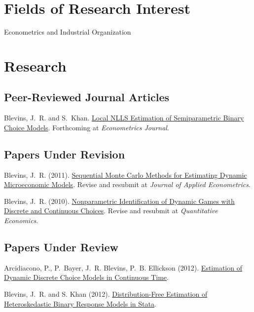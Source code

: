 \documentclass[10pt,letterpaper]{article}
\renewenvironment{itemize}{
  \begin{list}{}{
    \setlength{\leftmargin}{1.5em}
    \setlength{\itemsep}{0.25em}
    \setlength{\parskip}{0pt}
    \setlength{\parsep}{0.25em}
  }
}{
  \end{list}
}
\begin{document}
\section*{Fields of Research Interest}

Econometrics and Industrial Organization

\section*{Research}

\subsection*{Peer-Reviewed Journal Articles}

\begin{itemize}
\item Blevins, J.~R. and S.~Khan.
  \href{http://jblevins.org/research/lnlls}{Local NLLS Estimation of Semiparametric Binary Choice Models}.
  Forthcoming at \textit{Econometrics Journal}.
\end{itemize}

\subsection*{Papers Under Revision}

\begin{itemize}
\item Blevins, J.~R. (2011).
  \href{http://jblevins.org/research/smcdmm}{Sequential Monte Carlo Methods for Estimating Dynamic Microeconomic Models}.
  Revise and resubmit at \textit{Journal of Applied Econometrics}.
\item Blevins, J.~R. (2010).
  \href{http://jblevins.org/research/dcident}{Nonparametric Identification of Dynamic Games with Discrete and Continuous Choices}.
  Revise and resubmit at \textit{Quantitative Economics}.
\end{itemize}

\subsection*{Papers Under Review}

\begin{itemize}
\item Arcidiacono, P., P.~Bayer, J.~R. Blevins, P.~B. Ellickson (2012).
  \href{http://jblevins.org/research/abbe}{Estimation of Dynamic Discrete Choice Models in Continuous Time}.
\item Blevins, J.~R. and S. Khan (2012).
  \href{http://jblevins.org/research/dfbr/}{Distribution-Free Estimation of Heteroskedastic Binary Response Models in Stata}.
\end{itemize}
\end{document}
